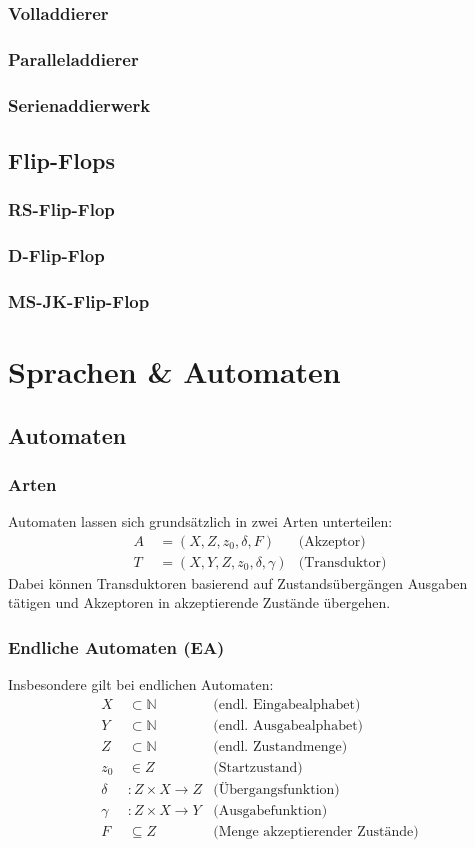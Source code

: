 \documentclass{article}
\begin{document}
\subsubsection{Volladdierer}
\subsubsection{Paralleladdierer}
\subsubsection{Serienaddierwerk}
\subsection{Flip-Flops}
\subsubsection{RS-Flip-Flop}
\subsubsection{D-Flip-Flop}
\subsubsection{MS-JK-Flip-Flop}
\section{Sprachen \& Automaten}
\subsection{Automaten}
\subsubsection{Arten}
Automaten lassen sich grundsätzlich in zwei Arten unterteilen:
\begin{align}
    A &\:=(X, Z, z_0, \delta, F) &\text{(Akzeptor)}\\
    T &\:=(X, Y, Z, z_0, \delta, \gamma)&\text{(Transduktor)}
\end{align}
Dabei können Transduktoren basierend auf Zustandsübergängen Ausgaben tätigen und Akzeptoren in akzeptierende Zustände übergehen.
\subsubsection {Endliche Automaten (EA)}
Insbesondere gilt bei endlichen Automaten:
\begin{align}
    X &\:\subset \mathbb{N} &\text{(endl. Eingabealphabet)}\\
    Y &\:\subset \mathbb{N} &\text{(endl. Ausgabealphabet)}\\
    Z &\:\subset \mathbb{N} &\text{(endl. Zustandmenge)}\\
    z_0 &\:\in Z &\text{(Startzustand)}\\
    \delta &\:: Z \times X \rightarrow Z &\text{(Übergangsfunktion)}\\
    \gamma &\:: Z \times X \rightarrow Y &\text{(Ausgabefunktion)}\\
    F &\:\subseteq Z &\text{(Menge akzeptierender Zustände)}
\end{align}
\end{document}
